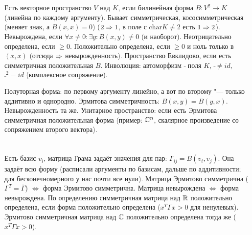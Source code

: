 \section{} %
Есть векторное пространство $V$ над $K$, если билинейная форма $B\colon V^2 \to K$ (линейна по каждому аргументу).
Бывает симметрическая, кососимметрическая (меняет знак, а $B(x,x)=0$) ($2 \Rightarrow 1$, в поле с $\mathrm{char} K \neq 2$ есть $1 \Rightarrow 2$).
Невырождена, если $\forall x \neq 0\colon \exists y\colon B(x,y)\neq 0$ (и наоборот).
Неотрицательно определена, если $\ge 0$.
Положительно определена, если $\ge 0$ и ноль только в $(x, x)$ (отсюда $\Rightarrow$ невырожденность).
Пространство Евклидово, если есть симметричная положительная $B$.
Инволюция: автоморфизм $\bar{}$ поля $K$, $\bar{} \neq id$, $\bar{}^2 = id$ (комплексное сопряжение).

Полуторная форма: по первому аргументу линейно, а вот по второму "--- только аддитивно и однородно.
Эрмитова симметричность: $B(x,y)=\overline{B(y,x)}$.
Невырожденность та же.
Унитарное пространство: если есть Эрмитова симметричная положительная форма (пример: $\mathbb{C}^n$, скалярное произведение со сопряжением второго вектора).

\section{} %
Есть базис $v_i$, матрица Грама задаёт значения для пар: $\Gamma_{ij}=B(v_i, v_j)$.
Она задаёт всю форму (расписали аргументы по базисам, дальше по аддитивности; для бесконечномерного у нас почти все нули).
Матрица Эрмитово симметрична ($\Gamma^T=\bar\Gamma$) $\iff$ форма Эрмитово симметрична.
Матрица невырождена $\iff$ форма невырождена.
\TODO[доказательство]
По определению симметричная матрица над $\mathbb{R}$ положительно определена, если форма положительно определена ($x^T\Gamma x > 0$ для ненулевых).
Эрмитово симметричная матрица над $\mathbb{C}$ положительно определена тогда же ($x^T\Gamma\bar x > 0$).

\section{} %
\TODO

\section{} %
\TODO

